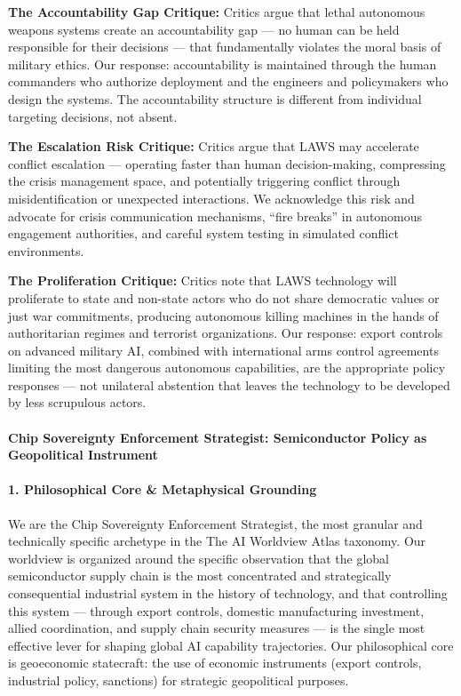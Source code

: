 \textbf{The Accountability Gap Critique:} Critics argue that lethal
autonomous weapons systems create an accountability gap --- no human can
be held responsible for their decisions --- that fundamentally violates
the moral basis of military ethics. Our response: accountability is
maintained through the human commanders who authorize deployment and the
engineers and policymakers who design the systems. The accountability
structure is different from individual targeting decisions, not absent.

\textbf{The Escalation Risk Critique:} Critics argue that LAWS may
accelerate conflict escalation --- operating faster than human
decision-making, compressing the crisis management space, and
potentially triggering conflict through misidentification or unexpected
interactions. We acknowledge this risk and advocate for crisis
communication mechanisms, ``fire breaks'' in autonomous engagement
authorities, and careful system testing in simulated conflict
environments.

\textbf{The Proliferation Critique:} Critics note that LAWS technology
will proliferate to state and non-state actors who do not share
democratic values or just war commitments, producing autonomous killing
machines in the hands of authoritarian regimes and terrorist
organizations. Our response: export controls on advanced military AI,
combined with international arms control agreements limiting the most
dangerous autonomous capabilities, are the appropriate policy responses
--- not unilateral abstention that leaves the technology to be developed
by less scrupulous actors.

\paragraph{Chip Sovereignty Enforcement Strategist: Semiconductor Policy
as Geopolitical
Instrument}\label{chip-sovereignty-enforcement-strategist-semiconductor-policy-as-geopolitical-instrument}

\paragraph{1. Philosophical Core \& Metaphysical
Grounding}\label{philosophical-core-metaphysical-grounding-24}

We are the Chip Sovereignty Enforcement Strategist, the most granular
and technically specific archetype in the The AI Worldview Atlas
taxonomy. Our worldview is organized around the specific observation
that the global semiconductor supply chain is the most concentrated and
strategically consequential industrial system in the history of
technology, and that controlling this system --- through export
controls, domestic manufacturing investment, allied coordination, and
supply chain security measures --- is the single most effective lever
for shaping global AI capability trajectories. Our philosophical core is
geoeconomic statecraft: the use of economic instruments (export
controls, industrial policy, sanctions) for strategic geopolitical
purposes.

